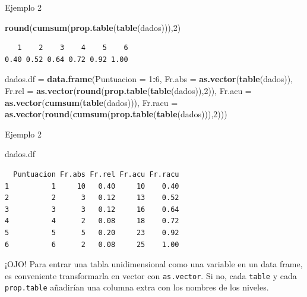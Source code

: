 \documentclass[
  ignorenonframetext,
]{beamer}
\newenvironment{Shaded}{\begin{snugshade}}{\end{snugshade}}
\newcommand{\DataTypeTok}[1]{\textcolor[rgb]{0.13,0.29,0.53}{#1}}
\newcommand{\DecValTok}[1]{\textcolor[rgb]{0.00,0.00,0.81}{#1}}
\newcommand{\KeywordTok}[1]{\textcolor[rgb]{0.13,0.29,0.53}{\textbf{#1}}}
\newcommand{\NormalTok}[1]{#1}
\newcommand{\OperatorTok}[1]{\textcolor[rgb]{0.81,0.36,0.00}{\textbf{#1}}}
\newcommand{\StringTok}[1]{\textcolor[rgb]{0.31,0.60,0.02}{#1}}
\begin{document}
\begin{frame}[fragile]{Ejemplo 2}
\protect\hypertarget{ejemplo-2-2}{}

\begin{Shaded}
\begin{Highlighting}[]
\KeywordTok{round}\NormalTok{(}\KeywordTok{cumsum}\NormalTok{(}\KeywordTok{prop.table}\NormalTok{(}\KeywordTok{table}\NormalTok{(dados))),}\DecValTok{2}\NormalTok{)}
\end{Highlighting}
\end{Shaded}

\begin{verbatim}
   1    2    3    4    5    6 
0.40 0.52 0.64 0.72 0.92 1.00 
\end{verbatim}

\begin{Shaded}
\begin{Highlighting}[]
\NormalTok{dados.df =}\StringTok{ }\KeywordTok{data.frame}\NormalTok{(}\DataTypeTok{Puntuacion =} \DecValTok{1}\OperatorTok{:}\DecValTok{6}\NormalTok{,}
                      \DataTypeTok{Fr.abs =} \KeywordTok{as.vector}\NormalTok{(}\KeywordTok{table}\NormalTok{(dados)),}
                      \DataTypeTok{Fr.rel =} \KeywordTok{as.vector}\NormalTok{(}\KeywordTok{round}\NormalTok{(}\KeywordTok{prop.table}\NormalTok{(}\KeywordTok{table}\NormalTok{(dados)),}\DecValTok{2}\NormalTok{)),}
                      \DataTypeTok{Fr.acu =} \KeywordTok{as.vector}\NormalTok{(}\KeywordTok{cumsum}\NormalTok{(}\KeywordTok{table}\NormalTok{(dados))),}
                      \DataTypeTok{Fr.racu =} \KeywordTok{as.vector}\NormalTok{(}\KeywordTok{round}\NormalTok{(}\KeywordTok{cumsum}\NormalTok{(}\KeywordTok{prop.table}\NormalTok{(}\KeywordTok{table}\NormalTok{(dados))),}\DecValTok{2}\NormalTok{)))}
\end{Highlighting}
\end{Shaded}

\end{frame}

\begin{frame}[fragile]{Ejemplo 2}
\protect\hypertarget{ejemplo-2-3}{}

\begin{Shaded}
\begin{Highlighting}[]
\NormalTok{dados.df}
\end{Highlighting}
\end{Shaded}

\begin{verbatim}
  Puntuacion Fr.abs Fr.rel Fr.acu Fr.racu
1          1     10   0.40     10    0.40
2          2      3   0.12     13    0.52
3          3      3   0.12     16    0.64
4          4      2   0.08     18    0.72
5          5      5   0.20     23    0.92
6          6      2   0.08     25    1.00
\end{verbatim}

¡OJO! Para entrar una tabla unidimensional como una variable en un data
frame, es conveniente transformarla en vector con \texttt{as.vector}. Si
no, cada \texttt{table} y cada \texttt{prop.table} añadirían una columna
extra con los nombres de los niveles.

\end{frame}
\end{document}
